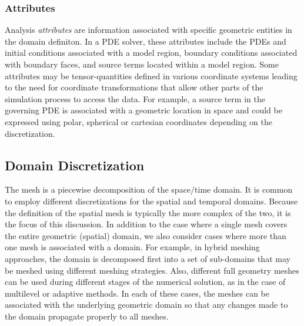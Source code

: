 \subsubsection{Attributes}
Analysis {\it attributes} are information
associated with specific geometric entities in
the domain definiton.  In a PDE solver, these attributes include
the PDEs and initial conditions associated with a model region,
boundary conditions associated with boundary faces, and source terms
located within a model region.  Some attributes may be tensor-quantities %
defined in various coordinate systems leading to the need for coordinate transformations
that allow other parts of the simulation process to access the data.
For example, a source term in the governing PDE is associated with a
geometric location in space and could be expressed using polar,
spherical or cartesian coordinates depending on the discretization.


\subsection{Domain Discretization}\label{sec:domainDisc}

The mesh is a piecewise decomposition of the space/time domain.  It is
common to employ different discretizations for the spatial and temporal
domains.  Because the definition of the spatial mesh is typically the
more complex of the two, it is the focus of this discussion.  In
addition to the case where a single mesh covers the entire geometric
(spatial) domain, we also consider cases where more than one mesh is
associated with a domain.  For example, in hybrid meshing approaches,
the domain is decomposed first into a set of sub-domains that may be
meshed using different meshing strategies.  Also, different full
geometry meshes can be used during different stages of the numerical
solution, as in the case of multilevel or adaptive methods.  In each of
these cases, the meshes can be associated with the underlying geometric
domain so that any changes made to the domain propagate properly to all
meshes.

